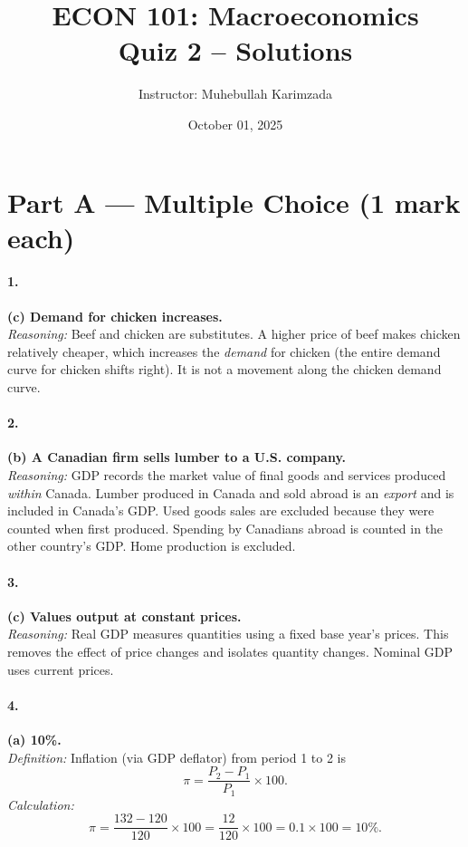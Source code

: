 \documentclass[11pt]{article}
\title{ECON 101: Macroeconomics \\ Quiz 2 -- Solutions}
\author{Instructor: Muhebullah Karimzada}
\date{October 01,  2025}
\begin{document}
\maketitle



\section*{Part A — Multiple Choice (1 mark each)}

\paragraph{1.} \textbf{(c) Demand for chicken increases.}\\
\emph{Reasoning:} Beef and chicken are substitutes. A higher price of beef makes chicken relatively cheaper, which increases the \emph{demand} for chicken (the entire demand curve for chicken shifts right). It is not a movement along the chicken demand curve.

\paragraph{2.} \textbf{(b) A Canadian firm sells lumber to a U.S. company.}\\
\emph{Reasoning:} GDP records the market value of final goods and services produced \emph{within} Canada. Lumber produced in Canada and sold abroad is an \emph{export} and is included in Canada’s GDP. Used goods sales are excluded because they were counted when first produced. Spending by Canadians abroad is counted in the other country’s GDP. Home production is excluded.

\paragraph{3.} \textbf{(c) Values output at constant prices.}\\
\emph{Reasoning:} Real GDP measures quantities using a fixed base year’s prices. This removes the effect of price changes and isolates quantity changes. Nominal GDP uses current prices.

\paragraph{4.} \textbf{(a) 10\%.}\\
\emph{Definition:} Inflation (via GDP deflator) from period 1 to 2 is
\[
\pi=\frac{P_2-P_1}{P_1}\times 100.
\]
\emph{Calculation:}
\[
\pi=\frac{132-120}{120}\times 100=\frac{12}{120}\times 100=0.1\times 100=10\%.
\]
\end{document}
